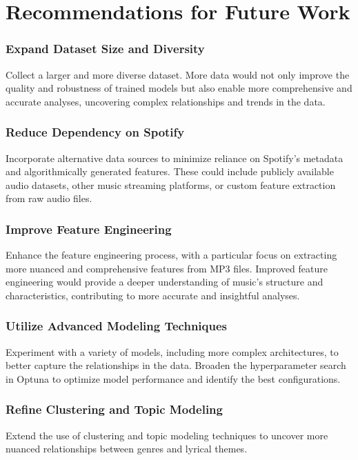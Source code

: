 \section{Recommendations for Future Work}
\label{sec:recommendationsforfuturework}


\subsubsection*{Expand Dataset Size and Diversity}
Collect a larger and more diverse dataset. More data would not only improve the
quality and robustness of trained models but also enable more comprehensive and
accurate analyses, uncovering complex relationships and trends in the
data.

\subsubsection*{Reduce Dependency on Spotify}
Incorporate alternative data sources to minimize reliance on Spotify's metadata
and algorithmically generated features. These could include publicly available
audio datasets, other music streaming platforms, or custom feature extraction
from raw audio files.


\subsubsection*{Improve Feature Engineering}
Enhance the feature engineering process, with a particular focus on extracting
more nuanced and comprehensive features from MP3 files. Improved feature
engineering would provide a deeper understanding of music's structure and
characteristics, contributing to more accurate and insightful analyses.

\subsubsection*{Utilize Advanced Modeling Techniques}
Experiment with a variety of models, including more complex architectures, to
better capture the relationships in the data. Broaden the hyperparameter search
in Optuna to optimize model performance and identify the best configurations.


\subsubsection*{Refine Clustering and Topic Modeling}
Extend the use of clustering and topic modeling techniques to uncover more
nuanced relationships between genres and lyrical themes.
